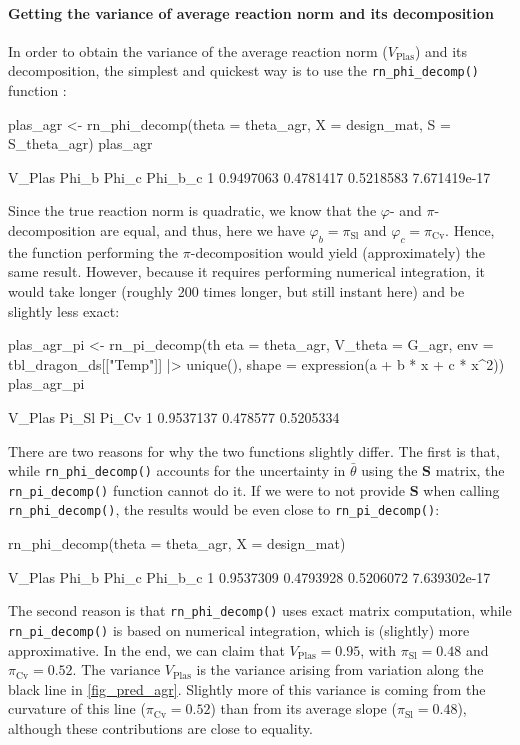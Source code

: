 \documentclass[a4paper,12pt,twoside]{article}
\begin{document}
\paragraph{Getting the variance of average reaction norm and its decomposition}
In order to obtain the variance of the average reaction norm ($V_{\text{Plas}}$) and its decomposition, the simplest and quickest way is to use the \texttt{rn\_phi\_decomp()} function :
\begin{Rinput}
plas_agr <-
    rn_phi_decomp(theta = theta_agr, X = design_mat, S = S_theta_agr)
plas_agr
\end{Rinput}
\begin{Routput}
     V_Plas     Phi_b     Phi_c      Phi_b_c
1 0.9497063 0.4781417 0.5218583 7.671419e-17
\end{Routput}
Since the true reaction norm is quadratic, we know that the $\varphi$- and $\pi$-decomposition are equal, and thus, here we have $\varphi_{b}=\pi_{\text{Sl}}$ and $\varphi_{c}=\pi_{\text{Cv}}$.
Hence, the function performing the $\pi$-decomposition would yield (approximately) the same result.
However, because it requires performing numerical integration, it would take longer (roughly 200 times longer, but still instant here) and be slightly less exact:
\begin{Rinput}
plas_agr_pi <-
    rn_pi_decomp(th eta   = theta_agr,
                 V_theta = G_agr,
                 env     = tbl_dragon_ds[["Temp"]] |> unique(),
                 shape   = expression(a + b * x + c * x^2))
plas_agr_pi
\end{Rinput}
\begin{Routput}
     V_Plas    Pi_Sl     Pi_Cv
1 0.9537137 0.478577 0.5205334
\end{Routput}
There are two reasons for why the two functions slightly differ. The first is that, while \texttt{rn\_phi\_decomp()} accounts for the uncertainty in $\bar{\theta}$ using the $\mathbf{S}$ matrix, the \texttt{rn\_pi\_decomp()} function cannot do it. If we were to not provide $\mathbf{S}$ when calling \texttt{rn\_phi\_decomp()}, the results would be even close to \texttt{rn\_pi\_decomp()}:
\begin{Rinput}
rn_phi_decomp(theta = theta_agr, X = design_mat)
\end{Rinput}
\begin{Routput}
     V_Plas     Phi_b     Phi_c      Phi_b_c
1 0.9537309 0.4793928 0.5206072 7.639302e-17
\end{Routput}
The second reason is that \texttt{rn\_phi\_decomp()} uses exact matrix computation, while \texttt{rn\_pi\_decomp()} is based on numerical integration, which is (slightly) more approximative.
In the end, we can claim that $V_{\text{Plas}}=0.95$, with $\pi_{\text{Sl}}=0.48$ and $\pi_{\text{Cv}}=0.52$.
The variance $V_{\text{Plas}}$ is the variance arising from variation along the black line in \autoref{fig_pred_agr}. 
Slightly more of this variance is coming from the curvature of this line ($\pi_{\text{Cv}}=0.52$) than from its average slope ($\pi_{\text{Sl}}=0.48$), although these contributions are close to equality.
\end{document}
